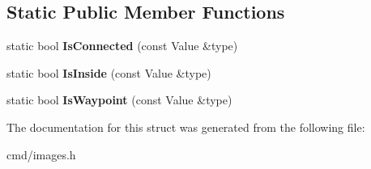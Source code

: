 \subsection*{Static Public Member Functions}
\begin{DoxyCompactItemize}
\item 
static bool {\bfseries Is\+Connected} (const Value \&type)\hypertarget{structDockingPorts_1_1Type_a5e38fe29da10dbaf3c0d5edc63e7f2e9}{}\label{structDockingPorts_1_1Type_a5e38fe29da10dbaf3c0d5edc63e7f2e9}

\item 
static bool {\bfseries Is\+Inside} (const Value \&type)\hypertarget{structDockingPorts_1_1Type_a908e5bc9a343fc5d9b338aaa2c203370}{}\label{structDockingPorts_1_1Type_a908e5bc9a343fc5d9b338aaa2c203370}

\item 
static bool {\bfseries Is\+Waypoint} (const Value \&type)\hypertarget{structDockingPorts_1_1Type_ac517c3e027792c15023115761f0bf123}{}\label{structDockingPorts_1_1Type_ac517c3e027792c15023115761f0bf123}

\end{DoxyCompactItemize}


The documentation for this struct was generated from the following file\+:\begin{DoxyCompactItemize}
\item 
cmd/images.\+h\end{DoxyCompactItemize}
